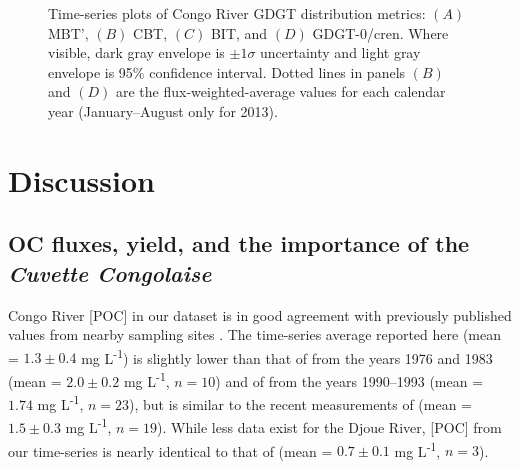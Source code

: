 \begin{figure}[ht]
	\caption[GDGT metric time-series plots]{Time-series plots of Congo River GDGT distribution metrics: $(A)$ MBT', $(B)$ CBT, $(C)$ BIT, and $(D)$ GDGT-0/cren. Where visible, dark gray envelope is $\pm 1 \sigma$ uncertainty and light gray envelope is 95\% confidence interval. Dotted lines in panels $(B)$ and $(D)$ are the flux-weighted-average values for each calendar year (January--August only for 2013).}
	\label{Ch5Fig:4} 
\end{figure}

\section{Discussion}

\subsection{OC fluxes, yield, and the importance of the \textit{Cuvette Congolaise}}

Congo River [POC] in our dataset is in good agreement with previously published values from nearby sampling sites \citep{Mariotti:1991vx,Coynel:2005cn,Spencer:2012en,Spencer:2016ho}. The time-series average reported here (mean = $1.3 \pm 0.4$ mg L\textsuperscript{-1}) is slightly lower than that of \citet{Mariotti:1991vx} from the years 1976 and 1983 (mean = $2.0 \pm 0.2$ mg L\textsuperscript{-1}, $n = 10$) and of \citet{Coynel:2005cn} from the years 1990--1993 (mean = $1.74$ mg L\textsuperscript{-1}, $n = 23$), but is similar to the recent measurements of \citet{Spencer:2012en,Spencer:2016ho} (mean = $1.5 \pm 0.3$ mg L\textsuperscript{-1}, $n = 19$). While less data exist for the Djoue River, [POC] from our time-series is nearly identical to that of \citet{Mariotti:1991vx} (mean = $0.7 \pm 0.1$ mg L\textsuperscript{-1}, $n = 3$).

